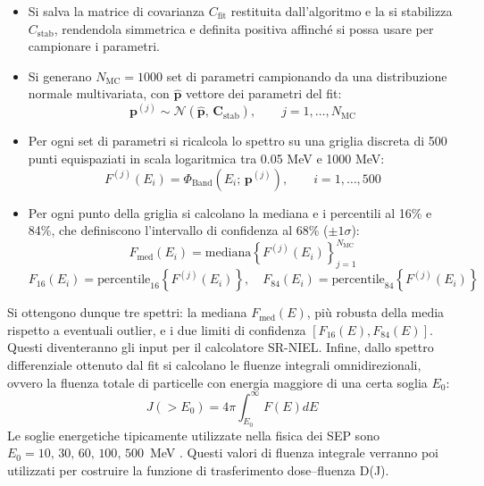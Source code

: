 \documentclass[12pt]{report}
\begin{document}
\begin{itemize}[nosep]

    \item[-] Si salva la matrice di covarianza $C_{\text{fit}}$ restituita dall'algoritmo e la si stabilizza $C_{\text{stab}}$, rendendola simmetrica e definita positiva affinché si possa usare per campionare i parametri. 
    \item[-] Si generano $N_{\text{MC}}= 1000$ set di parametri campionando da una distribuzione normale multivariata, con $\hat{\mathbf{p}}$ vettore dei parametri del fit:
    \begin{equation}
    \mathbf{p}^{(j)} \sim \mathcal{N}\!\left(\hat{\mathbf{p}},\, \mathbf{C}_{\mathrm{stab}}\right), \qquad j = 1, \ldots, N_{\mathrm{MC}}
    \end{equation}
    
    \item[-] Per ogni set di parametri si ricalcola lo spettro su una griglia discreta di 500 punti equispaziati in scala logaritmica tra 0.05 MeV e 1000 MeV:
    \begin{equation}
    F^{(j)}(E_i) = \Phi_{\mathrm{Band}}(E_i;\, \mathbf{p}^{(j)}), \qquad i = 1, \ldots, 500
    \end{equation}
    \item[-] Per ogni punto della griglia si calcolano la mediana e i percentili al 16\% e 84\%, che definiscono l'intervallo di confidenza al 68\% ($\pm1\sigma$):
   \begin{equation}
    F_{\mathrm{med}}(E_i) = \mathrm{mediana}\!\left\{F^{(j)}(E_i)\right\}_{j=1}^{N_{\mathrm{MC}}}
    \end{equation}
    \begin{equation}
    F_{16}(E_i) = \mathrm{percentile}_{16}\!\left\{F^{(j)}(E_i)\right\}, \quad F_{84}(E_i) = \mathrm{percentile}_{84}\!\left\{F^{(j)}(E_i)\right\}
    \end{equation}
    
\end{itemize}
Si ottengono dunque tre spettri: la mediana $F_{\text{med}}(E)$, più robusta della media rispetto a eventuali outlier, e i due limiti di confidenza $[F_{16}(E), F_{84}(E)]$. Questi diventeranno gli input per il calcolatore SR-NIEL.
Infine, dallo spettro differenziale ottenuto dal fit si calcolano le fluenze integrali omnidirezionali, ovvero la fluenza totale di particelle con energia maggiore di una certa soglia $E_{0}$:
\begin{equation}
    J(>E_{0}) = 4\pi \int_{E_{0}}^{\infty} F(E) dE 
    \label{eq: fluenza integrale}
\end{equation}
Le soglie energetiche tipicamente utilizzate nella fisica dei SEP sono $E_0 = 10,\, 30,\, 60,\, 100,\, 500$~MeV \cite{NOAA_SWPC_proton}. Questi valori di fluenza integrale verranno poi utilizzati per costruire la funzione di trasferimento dose--fluenza D(J).
\end{document}
